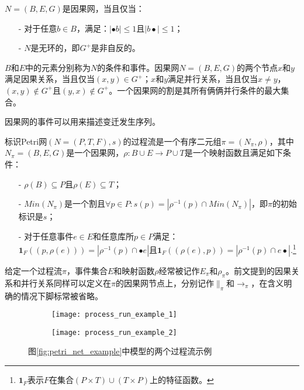 \begin{definition}\label{def:causal_net}
$N=(B,E,G)$是因果网，当且仅当：
  \begin{itemize}
  	\item[-] 对于任意$b\in B$，满足：$|\bullet b|\leq 1$且$|b\bullet|\leq 1$；
  	\item[-] $N$是无环的，即$G^{+}$是非自反的。
  \end{itemize}
\end{definition}

$B$和$E$中的元素分别称为$N$的条件和事件。因果网$N=(B,E,G)$的两个节点$x$和$y$满足因果关系，当且仅当$(x,y)\in G^{+}$；$x$和$y$满足并行关系，当且仅当$x\neq y$，$(x,y)\notin G^{+}$且$(y,x)\notin G^{+}$。一个因果网的割是其所有俩俩并行条件的最大集合。

因果网的事件可以用来描述变迁发生序列。

\begin{definition}\label{def:process_run}
标识Petri网$(N=(P,T,F),s)$的过程流是一个有序二元组$\pi=(N_{\pi},\rho)$，其中$N_{\pi}=(B,E,G)$是一个因果网，$\rho:B\cup E\rightarrow P\cup T$是一个映射函数且满足如下条件：
  \begin{itemize}
  	\item[-] $\rho(B)\subseteq P$且$\rho(E)\subseteq T$；
  	\item[-] $Min(N_{\pi})$是一个割且$\forall p\in P:s(p)=|\rho^{-1}(p)\cap Min(N_{\pi})|$，即$\pi$的初始标识是$s$；
  	\item[-] 对于任意事件$e\in E$和任意库所$p\in P$满足：$\bm{1}_{F}((p,\rho(e)))=|\rho^{-1}(p)\cap\bullet e|$且$\bm{1}_{F}((\rho(e),p))=|\rho^{-1}(p)\cap e\bullet|$.\footnote{$\bm{1}_{F}$表示$F$在集合$(P\times T)\cup(T\times P)$上的特征函数。}
  \end{itemize}
\end{definition}

给定一个过程流$\pi$，事件集合$E$和映射函数$\rho$经常被记作$E_{\pi}$和$\rho_{\pi}$。前文提到的因果关系和并行关系同样可以定义在$\pi$的因果网节点上，分别记作$\parallel_{\pi}$和$\rightarrow_{\pi}$，在含义明确的情况下脚标常被省略。

\begin{figure}[htbp]
  \centering
  \begin{subfigure}{1\textwidth}
  	\centering
  	\texttt{[image: process\_run\_example\_1]}
  	\caption{\label{fig:process_run_example_1}}
  \end{subfigure}
  \begin{subfigure}{1\textwidth}
  	\centering
  	\texttt{[image: process\_run\_example\_2]}
  	\caption{\label{fig:process_run_example_2}}
  \end{subfigure}
  \caption{图\ref{fig:petri_net_example}中模型的两个过程流示例}
\end{figure}

